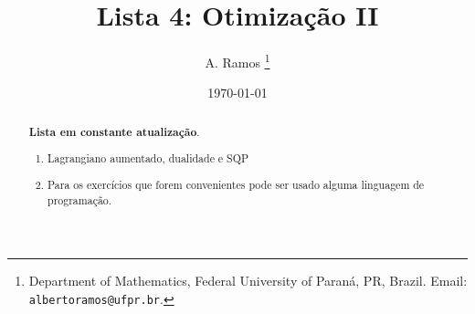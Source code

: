 \documentclass[a4paper,latin]{article}
\begin{document}
\title{Lista 4: Otimização II }
 
\author{
A. Ramos \thanks{Department of Mathematics,
    Federal University of Paraná, PR, Brazil.
    Email: {\tt albertoramos@ufpr.br}.}
}

\date{\today}
 
\maketitle

\begin{abstract}
{\bf Lista em constante atualização}.
 \begin{enumerate}
 \item Lagrangiano aumentado, dualidade e SQP
 \item Para os exercícios que forem convenientes pode ser usado alguma linguagem  de programação.  
 \end{enumerate}
\end{abstract}

       
\end{document}
